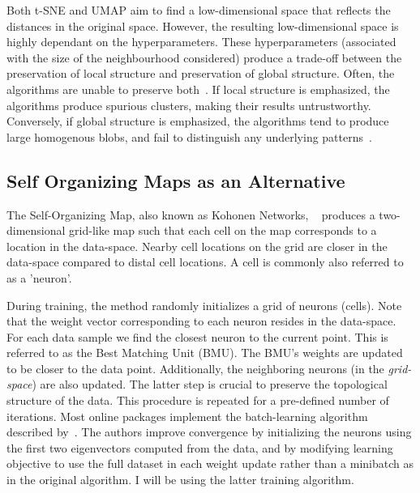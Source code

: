 Both t-SNE and UMAP aim to find a low-dimensional space that reflects the distances in the original space. However, the resulting low-dimensional space is highly dependant on the hyperparameters. These hyperparameters (associated with the size of the neighbourhood considered) produce a trade-off between the preservation of local structure and preservation of global structure. Often, the algorithms are unable to preserve both~\cite{pacmap}. If local structure is emphasized, the algorithms produce spurious clusters, making their results untrustworthy. Conversely, if global structure is emphasized, the algorithms tend to produce large homogenous blobs, and fail to distinguish any underlying patterns~\cite{leiQuantifyingImpactUninformative2023}.


\subsection*{Self Organizing Maps as an Alternative}

The Self-Organizing Map, also known as Kohonen Networks, ~\cite{kohonen1990self} produces a two-dimensional grid-like map such that each cell on the map corresponds to a location in the data-space. Nearby cell locations on the grid are closer in the data-space compared to distal cell locations. A cell is commonly also referred to as a 'neuron'.

During training, the method randomly initializes a grid of neurons (cells). Note that the weight vector corresponding to each neuron resides in the data-space. For each data sample we find the closest neuron to the current point. This is referred to as the Best Matching Unit (BMU). The BMU's weights are updated to be closer to the data point. Additionally, the neighboring neurons (in the \textit{grid-space}) are also updated. The latter step is crucial to preserve the topological structure of the data. This procedure is repeated for a pre-defined number of iterations. Most online packages implement the batch-learning algorithm described by~\cite{kinouchi2002quick}. The authors improve convergence by initializing the neurons using the first two eigenvectors computed from the data, and by modifying learning objective to use the full dataset in each weight update rather than a minibatch as in the original algorithm.  I will be using the latter training algorithm.

